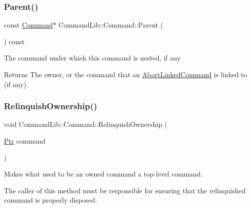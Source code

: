 \mbox{\label{class_command_lib_1_1_command_a19a55aef338aad892fc105b2e1f8700f}} 
\subsubsection{\texorpdfstring{Parent()}{Parent()}}
{\footnotesize\ttfamily const \mbox{\hyperlink{class_command_lib_1_1_command}{Command}}$\ast$ Command\+Lib\+::\+Command\+::\+Parent (\begin{DoxyParamCaption}{ }\end{DoxyParamCaption}) const}



The command under which this command is nested, if any

\begin{DoxyReturn}{Returns}
The owner, or the command that an \mbox{\hyperlink{class_command_lib_1_1_abort_linked_command}{Abort\+Linked\+Command}} is linked to (if any). 
\end{DoxyReturn}
\mbox{\label{class_command_lib_1_1_command_ac872e76c74ed573668b60351fd9ffd1d}} 
\subsubsection{\texorpdfstring{Relinquish\+Ownership()}{RelinquishOwnership()}}
{\footnotesize\ttfamily void Command\+Lib\+::\+Command\+::\+Relinquish\+Ownership (\begin{DoxyParamCaption}\item[{\mbox{\hyperlink{class_command_lib_1_1_command_a3b3e4f00144373299df5c6bb1acc319d}{Ptr}}}]{command }\end{DoxyParamCaption})\hspace{0.3cm}{\ttfamily [protected]}}



Makes what used to be an owned command a top-\/level command.

The caller of this method must be responsible for ensuring that the relinquished command is properly disposed.


